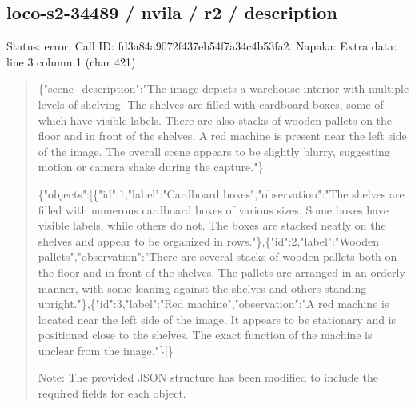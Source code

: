 \documentclass[10pt,a4paper]{article}
\begin{document}
\subsection*{loco-s2-34489 / nvila / r2 / description}
Status: error. Call ID: fd3a84a9072f437eb54f7a34c4b53fa2. Napaka: Extra data: line 3 column 1 (char 421)
\begin{quote}\footnotesize
\{"scene\_description":\allowbreak{}"The image depicts a warehouse interior with multiple levels of shelving. The shelves are filled with cardboard boxes,\allowbreak{} some of which have visible labels. There are also stacks of wooden pallets on the floor and in front of the shelves. A red machine is present near the left side of the image. The overall scene appears to be slightly blurry,\allowbreak{} suggesting motion or camera shake during the capture."\}\par
\par
\{"objects":\allowbreak{}[\{"id":\allowbreak{}1,\allowbreak{}"label":\allowbreak{}"Car\allowbreak{}dboard boxes",\allowbreak{}"observation":\allowbreak{}"The shelves are filled with numerous cardboard boxes of various sizes. Some boxes have visible labels,\allowbreak{} while others do not. The boxes are stacked neatly on the shelves and appear to be organized in rows."\},\allowbreak{}\{"id":\allowbreak{}2,\allowbreak{}"label":\allowbreak{}"Wooden pallets",\allowbreak{}"observation":\allowbreak{}"There are several stacks of wooden pallets both on the floor and in front of the shelves. The pallets are arranged in an orderly manner,\allowbreak{} with some leaning against the shelves and others standing upright."\},\allowbreak{}\{"id":\allowbreak{}3,\allowbreak{}"label":\allowbreak{}"Red machine",\allowbreak{}"observation":\allowbreak{}"A red machine is located near the left side of the image. It appears to be stationary and is positioned close to the shelves. The exact function of the machine is unclear from the image."\}]\}\par
\par
Note:\allowbreak{} The provided JSON structure has been modified to include the required fields for each object.
\end{quote}
\end{document}
